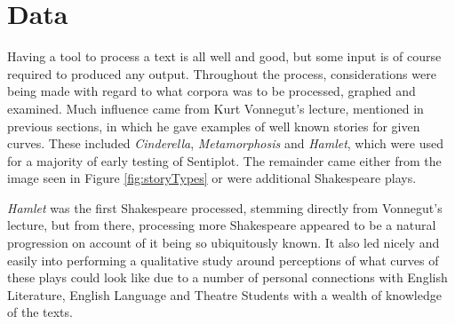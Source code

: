 \documentclass{article}
\begin{document}
{\section{Data}
    Having a tool to process a text is all well and good, but some input is of course required to produced any output. Throughout the process, considerations were being made with regard to what corpora was to be processed, graphed and examined. Much influence came from Kurt Vonnegut's lecture, mentioned in previous sections, in which he gave examples of well known stories for given curves. These included \textit{Cinderella}, \textit{Metamorphosis} and \textit{Hamlet}, which were used for a majority of early testing of Sentiplot. The remainder came either from the image seen in Figure \ref{fig:storyTypes} or were additional Shakespeare plays.

    \textit{Hamlet} was the first Shakespeare processed, stemming directly from Vonnegut's lecture, but from there, processing more Shakespeare appeared to be a natural progression on account of it being so ubiquitously known. It also led nicely and easily into performing a qualitative study around perceptions of what curves of these plays could look like due to a number of personal connections with English Literature, English Language and Theatre Students with a wealth of knowledge of the texts.
    
}
\end{document}
